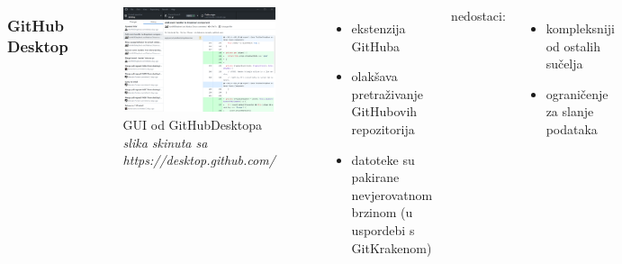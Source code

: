\documentclass[hyperref={bookmarks=false},aspectratio=169]{beamer}
\begin{document}
\begin{frame}
\begin{columns}
\frametitle{GitHub Desktop}
\begin{figure}


\includegraphics[width=\columnwidth]{./figures/github-desktop-screenshot-windows.png}
    \centering
    \caption{GUI od GitHubDesktopa  \emph{\\slika skinuta sa https://desktop.github.com/}}
\end{figure}
\begin{itemize}
    \item ekstenzija GitHuba
    \item olakšava pretraživanje GitHubovih repozitorija
    \item datoteke su pakirane nevjerovatnom brzinom (u uspordebi s GitKrakenom)
    \end{itemize}
    nedostaci:
    \begin{itemize}
     \item kompleksniji od ostalih sučelja
     \item ograničenje za slanje podataka
\end{itemize}
 
\end{columns}

\end{frame}
\end{document}
